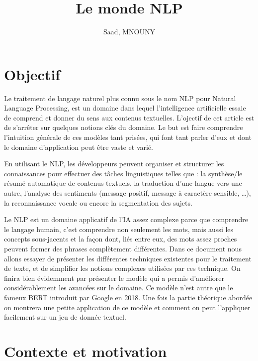\documentclass[8pt]{article}
\author{
  Saad, MNOUNY
}
\title{Le monde NLP}
\begin{document}
    
    \maketitle
    
    

    
    \hypertarget{objectif}{%
\section{Objectif}\label{objectif}}

    Le traitement de langage naturel plus connu sous le nom NLP pour Natural
Language Processing, est un domaine dans lequel l'intelligence
artificielle essaie de comprend et donner du sens aux contenus
textuelles. L'ojectif de cet article est de s'arrêter sur quelques
notions clés du domaine. Le but est faire comprendre l'intuition
générale de ces modèles tant prisées, qui font tant parler d'eux et dont
le domaine d'application peut être vaste et varié.

    En utilisant le NLP, les développeurs peuvent organiser et structurer
les connaissances pour effectuer des tâches linguistiques telles que :
la synthèse/le résumé automatique de contenus textuels, la traduction
d'une langue vers une autre, l'analyse des sentiments (message positif,
message à caractère sensible, \ldots), la reconnaissance vocale ou
encore la segmentation des sujets.

    Le NLP est un domaine applicatif de l'IA assez complexe parce que
comprendre le langage humain, c'est comprendre non seulement les mots,
mais aussi les concepts sous-jacents et la façon dont, liés entre eux,
des mots assez proches peuvent former des phrases complètement
différentes. Dans ce document nous allons essayer de présenter les
différentes techniques existentes pour le traitement de texte, et de
simplifier les notions complexes utilisées par ces technique. On finira
bien évidemment par présenter le modèle qui a permis d'améliorer
considérablement les avancées sur le domaine. Ce modèle n'est autre que
le fameux BERT introduit par Google en 2018. Une fois la partie
théorique abordée on montrera une petite application de ce modèle et
comment on peut l'appliquer facilement sur un jeu de donnée textuel.

    \hypertarget{contexte-et-motivation}{%
\section{Contexte et motivation}\label{contexte-et-motivation}}
\end{document}
